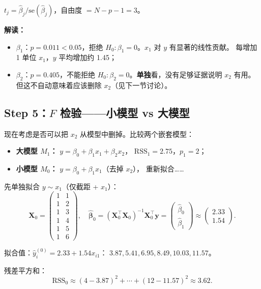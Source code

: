 $t_j = \hat{\beta}_j / \mathrm{se}(\hat{\beta}_j)$，自由度 $= N-p-1 = 3$。

\textbf{解读：}
\begin{itemize}
    \item $\beta_1$：$p = 0.011 < 0.05$，拒绝 $H_0: \beta_1 = 0$。$x_1$ 对 $y$ 有显著的线性贡献。
    每增加 1 单位 $x_1$，$y$ 平均增加约 1.45；
    \item $\beta_2$：$p = 0.405$，不能拒绝 $H_0: \beta_2 = 0$。\textbf{单独}看，没有足够证据说明 $x_2$ 有用。
    但这不自动意味着应该删除 $x_2$（见下一节讨论）。
\end{itemize}

\subsection{Step 5：$F$ 检验——小模型 vs 大模型}

现在考虑是否可以把 $x_2$ 从模型中删掉。比较两个嵌套模型：

\begin{itemize}
    \item \textbf{大模型 $M_1$：} $y = \beta_0 + \beta_1 x_1 + \beta_2 x_2$，
    $\mathrm{RSS}_1 = 2.75$，$p_1 = 2$；
    \item \textbf{小模型 $M_0$：} $y = \beta_0 + \beta_1 x_1$（去掉 $x_2$），
    重新拟合……
\end{itemize}

先单独拟合 $y \sim x_1$（仅截距 + $x_1$）：
\[
    \mathbf{X}_0 = \begin{pmatrix}
        1 & 1 \\ 1 & 2 \\ 1 & 3 \\ 1 & 4 \\ 1 & 5 \\ 1 & 6
    \end{pmatrix},
    \quad
    \hat{\bm{\beta}}_0 = (\mathbf{X}_0^\top \mathbf{X}_0)^{-1} \mathbf{X}_0^\top \mathbf{y}
    = \begin{pmatrix} \hat{\beta}_0 \\ \hat{\beta}_1 \end{pmatrix}
    \approx \begin{pmatrix} 2.33 \\ 1.54 \end{pmatrix}.
\]

拟合值：$\hat{y}_i^{(0)} = 2.33 + 1.54 x_{i1}$：
$3.87, 5.41, 6.95, 8.49, 10.03, 11.57$。

残差平方和：
\[
    \mathrm{RSS}_0 \approx (4-3.87)^2 + \cdots + (12-11.57)^2 \approx 3.62.
\]

